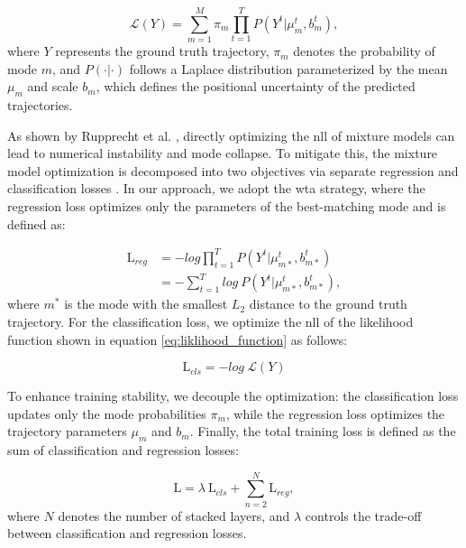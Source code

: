 \begin{equation}
    \mathcal{L}(Y) = \sum_{m=1}^M \pi_m \prod_{t=1}^T P(Y^t | \mu_m^t, b_m^t),
    \label{eq:liklihood_function}
\end{equation}
where $Y$ represents the ground truth trajectory, $\pi_m$ denotes the probability of mode $m$, and $P(\cdot|\cdot)$ follows a Laplace distribution parameterized by the mean $\mu_m$ and scale $b_m$, which defines the positional uncertainty of the predicted trajectories. %

As shown by Rupprecht et al. \cite{rupprecht2017learning}, directly optimizing the \ac{nll} of mixture models can lead to numerical instability and mode collapse. To mitigate this, the mixture model optimization is decomposed into two objectives via separate regression and classification losses \cite{cui2019multimodal,makansi2019overcoming,zhou2022hivt,yadav2025caspformer}. In our approach, we adopt the \ac{wta} strategy, where the regression loss optimizes only the parameters of the best-matching mode and is defined as:

\begin{align}
    \mathrm{L}_{reg} & = - log \prod_{t=1}^T P(Y^t | \mu_{m*}^t, b_{m*}^t) \nonumber \\
                    & = - \sum_{t=1}^T log \ P(Y^t | \mu_{m*}^t, b_{m*}^t),
\end{align}
where $m^*$ is the mode with the smallest $L_2$ distance to the ground truth trajectory. For the classification loss, we optimize the \ac{nll} of the likelihood function shown in equation \eqref{eq:liklihood_function} as follows:

\begin{equation}
    \mathrm{L}_{cls} = - log \ \mathcal{L}(Y)
\end{equation}

To enhance training stability, we decouple the optimization: the classification loss updates only the mode probabilities $\pi_m$, while the regression loss optimizes the trajectory parameters $\mu_m$ and $b_m$. Finally, the total training loss is defined as the sum of classification and regression losses:

\begin{equation}
    \mathrm{L} = \lambda \ \mathrm{L}_{cls} + \sum_{n=2}^{N}\mathrm{L}_{reg},
\end{equation}
where $N$ denotes the number of stacked layers, and $\lambda$ controls the trade-off between classification and regression losses.